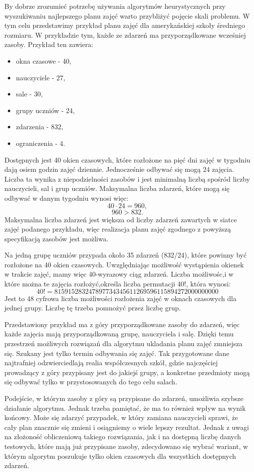 By dobrze zrozumieć potrzebę używania algorytmów heurystycznych przy wyszukiwaniu najlepszego planu zajęć warto przybliżyć pojęcie skali problemu. W tym celu przedstawimy przykład planu zajęć dla amerykańskiej szkoły średniego rozmiaru. W przykładzie tym, każde ze zdarzeń ma przyporządkowane wcześniej zasoby. Przykład ten zawiera:

\begin{itemize}
	\item okna czasowe - 40,
	\item nauczyciele - 27,
	\item sale - 30,
	\item grupy uczniów - 24,
	\item zdarzenia - 832,
	\item ograniczenia - 4.
\end{itemize}

Dostępnych jest 40 okien czasowych, które rozłożone na pięć dni zajęć w tygodniu dają osiem godzin zajęć dziennie. Jednocześnie odbywać się mogą 24 zajęcia. Liczba ta wynika z niepodzielności zasobów i jest minimalną liczbą spośród liczby nauczycieli, sal i grup uczniów. Maksymalna liczba zdarzeń, które mogą się odbywać w danym tygodniu wynosi więc:
\[ 40 \cdot 24 = 960, \]
\[ 960 > 832. \]
Maksymalna liczba zdarzeń jest większa od liczby zdarzeń zawartych w siatce zajęć podanego przykładu, więc realizacja  planu zajęć zgodnego z powyższą specyfikacją zasobów jest możliwa.

Na jedną grupę uczniów przypada około 35 zdarzeń (832/24), które powinny być rozłożone na 40 okien czasowych. Uwzględniając możliwość wystąpienia okienek w trakcie zajęć, mamy więc 40-wyrazowy ciąg zdarzeń. Liczba możliwośc,i w które można te zajęcia rozłożyć,określa liczba permutacji 40!, która wynosi:
\[40! = 815915283247897734345611269596115894272000000000\]
Jest to 48 cyfrowa liczba możliwości rozłożenia zajęć w oknach czasowych dla jednej grupy. Liczbę tę trzeba pomnożyć przez liczbę grup.

Przedstawiony przykład ma z góry przyporządkowane zasoby do zdarzeń, więc każde zajęcia mają przyporządkowaną grupę, nauczyciela i salę. Dzięki temu przestrzeń możliwych rozwiązań dla algorytmu ukladania planu zajęć zmniejsza się. Szukany jest tylko termin odbywania się zajęć. Tak przygotowane dane najtrafniej odzwierciedlają realia współczesnych szkół, gdzie najczęściej prowadzący z góry przypisany jest do jakiejś grupy, a konkretne przedmioty mogą się odbywać tylko w przystosowanych do tego celu salach.

Podejście, w którym zasoby z góry są przypisane do zdarzeń, umożliwia szybsze działanie algorytmu. Jednak trzeba pamiętać, że ma to również wpływ na wynik końcowy. Może się zdarzyć przypadek, w który zamiana nauczycieli sprawi, że cały plan znacznie się zmieni i osiągniemy o wiele lepszy rezultat. Jednak z uwagi na złożoność obliczeniową takiego rozwiązania, jak i na dostępną liczbę danych testowych, które mają już przypisane zasoby, zdecydowano się wybrać wariant, w którym algorytm poszukuje tylko okien czasowych dla wszystkich dostępnych zdarzeń.